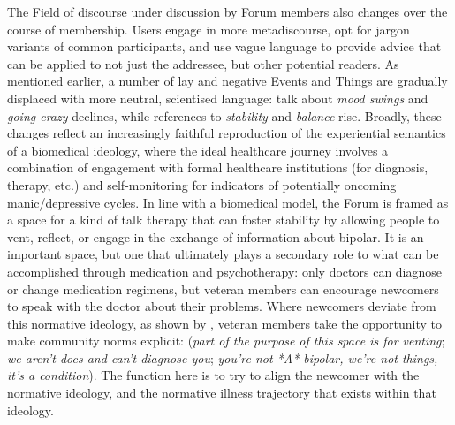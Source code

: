 The Field of discourse under discussion by \gls{Forum} \glspl{member} also changes over the course of membership. Users engage in more metadiscourse, opt for jargon variants of common participants, and use vague language to provide advice that can be applied to not just the addressee, but other potential readers. As mentioned earlier, a number of lay and negative Events and Things are gradually displaced with more neutral, scientised language: talk about \emph{mood swings} and \emph{going crazy} declines, while references to \emph{stability} and \emph{balance} rise. Broadly, these changes reflect an increasingly faithful reproduction of the experiential semantics of a biomedical ideology, where the ideal healthcare journey involves a combination of engagement with formal healthcare institutions (for diagnosis, therapy, etc.) and self-monitoring for indicators of potentially oncoming manic\slash depressive cycles. In line with a biomedical model, the \gls{Forum} is framed as a space for a kind of talk therapy that can foster stability by allowing people to vent, reflect, or engage in the exchange of information about \gls{bipolar}. It is an important space, but one that ultimately plays a secondary role to what can be accomplished through medication and psychotherapy: only doctors can diagnose or change medication regimens, but veteran \glspl{member} can encourage newcomers to speak with the doctor about their problems. Where newcomers deviate from this normative ideology, as shown by \textcite{weber_missed_2011}, veteran \glspl{member} take the opportunity to make community norms explicit: (\emph{part of the purpose of this space is for venting}; \emph{we aren't docs and can't diagnose you}; \emph{you're not *A* bipolar, we're not things, it's a condition}). The function here is to try to align the newcomer with the normative ideology, and the normative illness trajectory that exists within that ideology.

